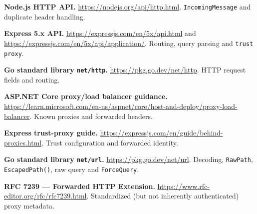 \documentclass[10pt,letterpaper,oneside]{article}
\newcommand{\code}[1]{\texttt{#1}}
\begin{document}
\begin{enumerate}[label={[\arabic*]},leftmargin=2.1em,itemsep=6pt]
\item \textbf{Node.js HTTP API.} \url{https://nodejs.org/api/http.html}. \code{IncomingMessage} and duplicate header handling.
\item \textbf{Express 5.x API.} \url{https://expressjs.com/en/5x/api.html} and \url{https://expressjs.com/en/5x/api/application/}. Routing, query parsing and \code{trust proxy}.
\item \textbf{Go standard library \code{net/http}.} \url{https://pkg.go.dev/net/http}. HTTP request fields and routing.
\item \textbf{ASP.NET Core proxy/load balancer guidance.} \url{https://learn.microsoft.com/en-us/aspnet/core/host-and-deploy/proxy-load-balancer}. Known proxies and forwarded headers.
\item \textbf{Express trust-proxy guide.} \url{https://expressjs.com/en/guide/behind-proxies.html}. Trust configuration and forwarded identity.
\item \textbf{Go standard library \code{net/url}.} \url{https://pkg.go.dev/net/url}. Decoding, \code{RawPath}, \code{EscapedPath()}, raw query and \code{ForceQuery}.
\item \textbf{RFC 7239 --- Forwarded HTTP Extension.} \url{https://www.rfc-editor.org/rfc/rfc7239.html}. Standardized (but not inherently authenticated) proxy metadata.
\end{enumerate}

\clearpage
\end{document}
